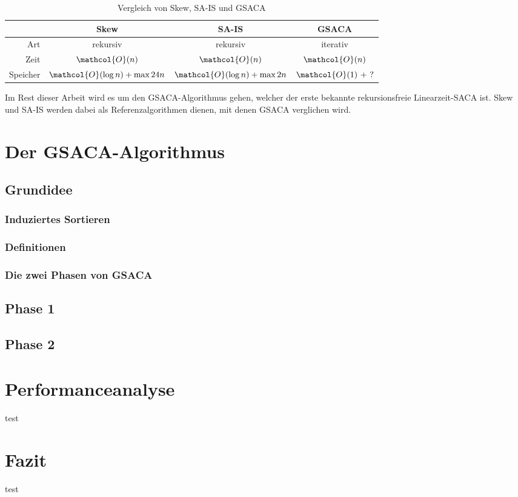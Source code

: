 \documentclass[twoside,11pt]{article}
\theoremstyle{break}
\begin{document}
\begin{table}[h]
\begin{center}
\begin{tabular}{r | c c c}
& Skew & SA-IS & \textbf{GSACA} \\
\hline
Art & \textcolor{rot}{rekursiv} & \textcolor{rot}{rekursiv} & \textcolor{gruen}{iterativ} \\
Zeit & $\mathcol{O}(n)$ & $\mathcol{O}(n)$ & $\mathcol{O}(n)$ \\
Speicher & $\mathcol{O}(\log n) + \max 24n$ & $\mathcol{O}(\log n) + \max 2n$ & $\mathcol{O}(1)\ +\ ?$
\end{tabular}

\caption{Vergleich von Skew, SA-IS und GSACA}
\label{tab:skewSaisGsacaComparison}
\end{center}
\end{table}

Im Rest dieser Arbeit wird es um den GSACA-Algorithmus gehen, welcher der erste bekannte rekursionsfreie Linearzeit-SACA ist. Skew und SA-IS werden dabei als Referenzalgorithmen dienen, mit denen GSACA verglichen wird.

\section{Der GSACA-Algorithmus}

\subsection{Grundidee}

\subsubsection{Induziertes Sortieren}

\subsubsection{Definitionen}

\subsubsection{Die zwei Phasen von GSACA}

\subsection{Phase 1}

\subsection{Phase 2}


\section{Performanceanalyse}

test

\section{Fazit}

test



\end{document}
